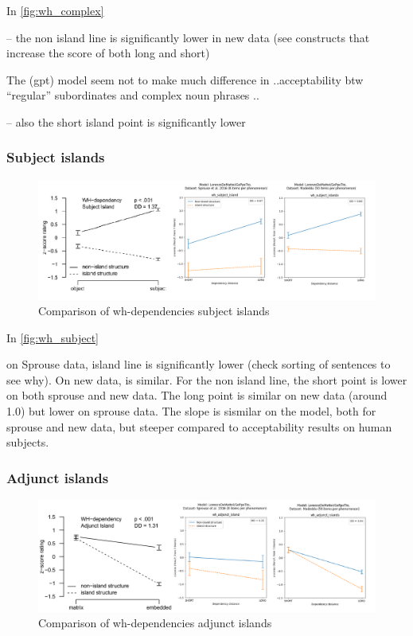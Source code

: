 In \autoref{fig:wh_complex} 

-- the non island line is significantly lower in new data (see constructs that increase the score of both long and short)

The (gpt) model seem not to make much difference in ..acceptability btw “regular” subordinates and complex noun phrases ..

-- also the short island point is significantly lower


\subsubsection{Subject islands}

\begin{figure}
	\centering
	\includegraphics[width=1\textwidth]{images/Chapter1/combined_wh-subject.png} 
	\caption{Comparison of wh-dependencies subject islands} 
	\label{fig:wh_subject} %
\end{figure}

In \autoref{fig:wh_subject}

on Sprouse data, island line is significantly lower (check sorting of sentences to see why). On new data, is similar.
For the non island line, the short point is lower on both sprouse and new data. The long point is similar on new data (around 1.0) but lower on sprouse data. The slope is sismilar on the model, both for sprouse and new data, but steeper compared to acceptability results on human subjects.


\subsubsection{Adjunct islands}

\begin{figure}
	\centering
	\includegraphics[width=1\textwidth]{images/Chapter1/combined_wh-adjunct.png} 
	\caption{Comparison of wh-dependencies adjunct islands} 
	\label{fig:wh_adjunct} %
\end{figure}


